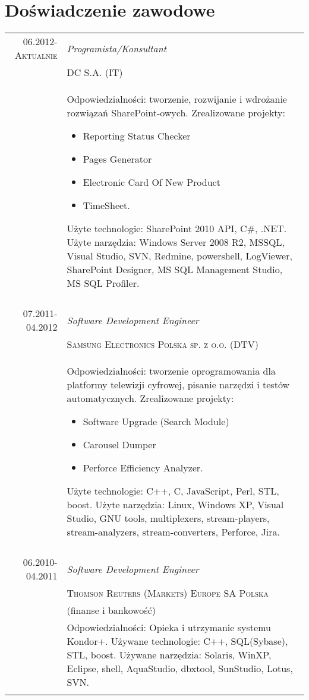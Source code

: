 \documentclass[a4paper,10pt]{article}
\begin{document}
    \section{Doświadczenie zawodowe}
        \begin{tabular}{r|p{11cm}}
			\textsc{06.2012-Aktualnie}
			&\emph{Programista/Konsultant}\\
			&\textsc{DC S.A.} (IT)\\
			&\footnotesize{ 
				Odpowiedzialności: tworzenie, rozwijanie i wdrożanie rozwiązań SharePoint-owych. \newline
				Zrealizowane projekty:
				\begin{itemize}
					\item Reporting Status Checker
					\item Pages Generator
					\item Electronic Card Of New Product
					\item TimeSheet.
				\end{itemize}
				Użyte technologie: SharePoint 2010 API, C\#, .NET. Użyte narzędzia: Windows Server 2008 R2, MSSQL, Visual Studio, 
				SVN, Redmine, powershell, LogViewer, SharePoint Designer, MS SQL Management Studio, MS SQL Profiler.
			}\\
			\multicolumn{2}{c}{}\\
	
			\textsc{07.2011-04.2012}
			&\emph{Software Development Engineer}\\
			&\textsc{Samsung Electronics Polska sp. z o.o.} (DTV)\\
			&\footnotesize{ 
				Odpowiedzialności: tworzenie oprogramowania dla platformy telewizji cyfrowej, pisanie narzędzi i testów automatycznych. \newline
				Zrealizowane projekty:
				\begin{itemize}
					\item Software Upgrade (Search Module)
					\item Carousel Dumper
					\item Perforce Efficiency Analyzer.
				\end{itemize}
				Użyte technologie: C++, C, JavaScript, Perl, STL, boost. Użyte narzędzia: Linux, Windows XP, Visual Studio, GNU tools, multiplexers, 
				stream-players, stream-analyzers, stream-converters, Perforce, Jira.
			}\\				
			\multicolumn{2}{c}{}\\
	
			 \textsc{06.2010-04.2011}
			 &\emph{Software Development Engineer} \\
			 &\textsc{Thomson Reuters (Markets) Europe SA Polska} \\
			 & (finanse i bankowość) \\
			 &\footnotesize{
							Odpowiedzialności: Opieka i utrzymanie systemu Kondor+. Używane technologie: C++, SQL(Sybase), STL, boost.
							Używane narzędzia: Solaris, WinXP, Eclipse, shell, AquaStudio, dbxtool, SunStudio, Lotus, 
							SVN.}\\
			 \multicolumn{2}{c}{} \\


\end{tabular}
\end{document}
